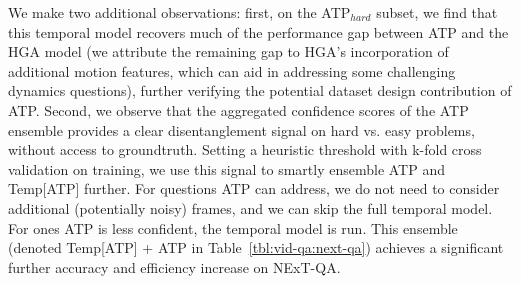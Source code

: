 We make two additional observations: first, on the ATP$_{hard}$ subset, we find that this temporal model recovers much of the performance gap between ATP and the HGA model (we attribute the remaining gap to HGA's incorporation of additional motion features, which can aid in addressing some challenging dynamics questions), further verifying the potential dataset design contribution of ATP. Second, we observe that the aggregated confidence scores of the ATP ensemble provides a clear disentanglement signal on hard vs. easy problems, without access to groundtruth. 
Setting a heuristic threshold with k-fold cross validation on training, we use this signal to smartly ensemble ATP and Temp[ATP] further. For questions ATP can address, we do not need to consider additional (potentially noisy) frames, and we can skip the full temporal model. For ones ATP is less confident, the temporal model is run. This ensemble (denoted Temp[ATP] + ATP in Table~\ref{tbl:vid-qa:next-qa}) achieves a significant further accuracy and efficiency increase on NExT-QA.

%